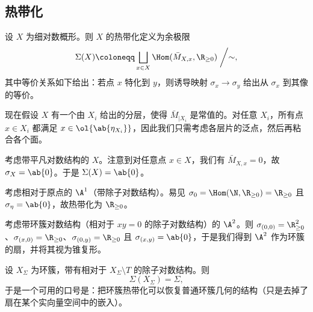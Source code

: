 \subsection{热带化}%
\label{sub:Tropicalization}

设 \(X\) 为细对数概形。则 \(X\) 的热带化定义为余极限
\[\Sigma(X) \coloneqq \bigsqcup_{x \in X} \Hom(\bar{M}_{X,x}, \R_{\geq 0}) \biggm/ \sim, \]
其中等价关系如下给出：若点 \(x\) 特化到 \(y\)，则诱导映射 \(\sigma_x \to \sigma_y\) 给出从 \(\sigma_x\) 到其像的等价。

现在假设 \(X\) 有一个由 \(X_i\) 给出的分层，使得 \(\bar{M}_{|X_i}\) 是常值的。对任意 \(X_i\)，所有点 \(x \in X_i\) 都满足 \(x \in \ol{\ab\{\eta_{X_i}\}}\)，因此我们只需考虑各层片的泛点，然后再粘合各个面。

\begin{exm}
    考虑带平凡对数结构的 \(X\)。注意到对任意点 \(x \in X\)，我们有 \(\bar{M}_{X,x} = 0\)，故 \(\sigma_X = \ab\{0\}\)。于是 \(\Sigma(X) = \ab\{0\}\)。
\end{exm}

\begin{exm}
    考虑相对于原点的 \(\A^1\)（带除子对数结构）。易见 \(\sigma_0 = \Hom(\N, \R_{\geq 0}) = \R_{\geq 0}\) 且 \(\sigma_{\eta} = \ab\{0\}\)，故热带化为 \(\R_{\geq 0}\)。
\end{exm}

\begin{exm}
    考虑带环簇对数结构（相对于 \(xy = 0\) 的除子对数结构）的 \(\A^2\)。则 \(\sigma_{(0,0)} = \R^2_{\geq 0}\)、\(\sigma_{(x,0)} = \R_{\geq 0}\)、\(\sigma_{(0,y)} = \R_{\geq 0}\) 且 \(\sigma_{(x,y)} = \ab\{0\}\)，于是我们得到 \(\A^2\) 作为环簇的扇，并将其视为锥复形。
\end{exm}

\begin{exm}
    设 \(X_{\Sigma}\) 为环簇，带有相对于 \(X_{\Sigma} \setminus T\) 的除子对数结构。则
    \[ \Sigma(X_{\Sigma}) = \Sigma, \]
    于是一个可用的口号是：把环簇热带化可以恢复普通环簇几何的结构（只是去掉了扇在某个实向量空间中的嵌入）。
\end{exm}

